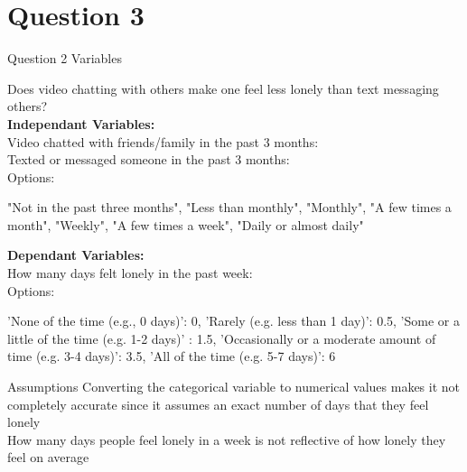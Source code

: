 \documentclass{beamer}
\begin{document}
\section{Question 3}
\begin{frame}{Question 2 Variables}

Does video chatting with others make one feel less lonely than text messaging others?\\

\textbf{Independant Variables:}\\

Video chatted with friends/family in the past 3 months:\\

Texted or messaged someone in the past 3 months:\\

Options:
\begin{itemize}
    "Not in the past three months",
    "Less than monthly",
    "Monthly",
    "A few times a month",
    "Weekly",
    "A few times a week",
    "Daily or almost daily"
\end{itemize}

\textbf{Dependant Variables:}\\

How many days felt lonely in the past week:\\

Options:
\begin{itemize}
'None of the time (e.g., 0 days)': 0,
    'Rarely (e.g. less than 1 day)': 0.5,
    'Some or a little of the time (e.g. 1-2 days)' : 1.5,
    'Occasionally or a moderate amount of time (e.g. 3-4 days)': 3.5,
    'All of the time (e.g. 5-7 days)': 6
\end{itemize}
\end{frame}

\begin{frame}{Assumptions}
Converting the categorical variable to numerical values makes it not completely accurate since it assumes an exact number of days that they feel lonely\\


How many days people feel lonely in a week is not reflective of how lonely they feel on average\\
\end{frame}
\end{document}
